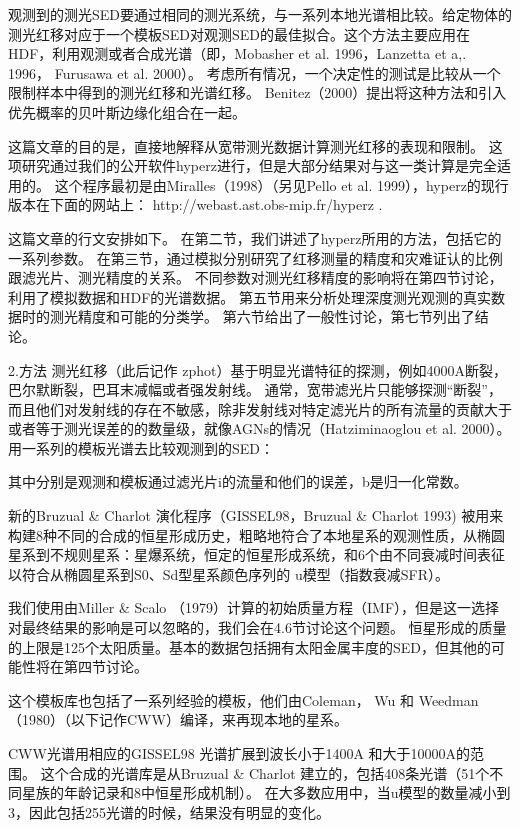 \documentclass[8pt,a4paper,openany,twoside]{book}
\begin{document}
观测到的测光SED要通过相同的测光系统，与一系列本地光谱相比较。给定物体的测光红移对应于一个模板SED对观测SED的最佳拟合。这个方法主要应用在HDF，利用观测或者合成光谱（即，Mobasher et al. 1996，Lanzetta et a,. 1996， Furusawa et al. 2000）。
考虑所有情况，一个决定性的测试是比较从一个限制样本中得到的测光红移和光谱红移。
Benitez（2000）提出将这种方法和引入优先概率的贝叶斯边缘化组合在一起。
 
这篇文章的目的是，直接地解释从宽带测光数据计算测光红移的表现和限制。
这项研究通过我们的公开软件hyperz进行，但是大部分结果对与这一类计算是完全适用的。
这个程序最初是由Miralles（1998）（另见Pello et al. 1999），hyperz的现行版本在下面的网站上：
http://webast.ast.obs-mip.fr/hyperz .
 
这篇文章的行文安排如下。
在第二节，我们讲述了hyperz所用的方法，包括它的一系列参数。
在第三节，通过模拟分别研究了红移测量的精度和灾难证认的比例跟滤光片、测光精度的关系。
不同参数对测光红移精度的影响将在第四节讨论，利用了模拟数据和HDF的光谱数据。
第五节用来分析处理深度测光观测的真实数据时的测光精度和可能的分类学。
第六节给出了一般性讨论，第七节列出了结论。
 
2.方法
测光红移（此后记作 zphot）基于明显光谱特征的探测，例如4000A断裂，巴尔默断裂，巴耳末减幅或者强发射线。
通常，宽带滤光片只能够探测“断裂”，而且他们对发射线的存在不敏感，除非发射线对特定滤光片的所有流量的贡献大于或者等于测光误差的的数量级，就像AGNs的情况（Hatziminaoglou et al. 2000）。
用一系列的模板光谱去比较观测到的SED：
 
其中分别是观测和模板通过滤光片i的流量和他们的误差，b是归一化常数。
 
新的Bruzual \& Charlot 演化程序（GISSEL98，Bruzual \& Charlot 1993) 被用来构建8种不同的合成的恒星形成历史，粗略地符合了本地星系的观测性质，从椭圆星系到不规则星系：星爆系统，恒定的恒星形成系统，和6个由不同衰减时间表征以符合从椭圆星系到S0、Sd型星系颜色序列的 u模型（指数衰减SFR）。
 
我们使用由Miller \& Scalo （1979）计算的初始质量方程（IMF），但是这一选择对最终结果的影响是可以忽略的，我们会在4.6节讨论这个问题。
恒星形成的质量的上限是125个太阳质量。基本的数据包括拥有太阳金属丰度的SED，但其他的可能性将在第四节讨论。
 
这个模板库也包括了一系列经验的模板，他们由Coleman， Wu 和 Weedman（1980）（以下记作CWW）编译，来再现本地的星系。
 
CWW光谱用相应的GISSEL98 光谱扩展到波长小于1400A 和大于10000A的范围。
这个合成的光谱库是从Bruzual \& Charlot 建立的，包括408条光谱（51个不同星族的年龄记录和8中恒星形成机制）。
在大多数应用中，当u模型的数量减小到3，因此包括255光谱的时候，结果没有明显的变化。
 
\end{document}
